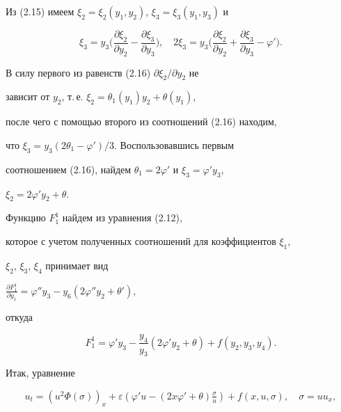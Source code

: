  


Из (2.15) имеем $\xi_2=\xi_2(y_1,y_2)$, $\xi_3=\xi_3(y_1,y_3)$ и 


\begin{equation} 


\xi_3=y_3\bigg( 


\frac{\partial\xi_2}{\partial y_2}- 


\frac{\partial\xi_3}{\partial y_3}\bigg),\quad 


2\xi_3=y_3\bigg( 


\frac{\partial\xi_2}{\partial y_2}+ 


\frac{\partial\xi_3}{\partial y_3}-\varphi'\bigg).\tag{2.16} 


\end{equation} 


В силу первого из равенств (2.16) $\partial\xi_2/\partial y_2$ не 


зависит от $y_2$, т.\,е. $\xi_2=\theta_1(y_1)y_2+\theta(y_1)$, 


после чего с помощью второго из соотношений (2.16) находим, 


что $\xi_3=y_3(2\theta_1-\varphi')/3$. Воспользовавшись первым 


соотношением (2.16), найдем $\theta_1=2\varphi'$ и $\xi_3=\varphi'y_3$, 


$\xi_2=2\varphi'y_2+\theta$. 


 


Функцию $F^1_1$ найдем из уравнения (2.12), 


которое с учетом полученных соотношений для коэффициентов $\xi_1$, 


$\xi_2$, $\xi_3$, $\xi_4$ принимает вид 


$\frac{\partial F^1_1}{\partial y_1}=\varphi''y_3-y_6 


(2\varphi''y_2+\theta')$, 


откуда 


$$ 


F^1_1=\varphi'y_3-\frac{y_4}{y_3}(2\varphi'y_2+\theta)+ 


f(y_2,y_3,y_4). 


$$ 


 


Итак, уравнение 


\begin{equation} 


u_t=(u^2\Phi(\sigma))_x+\varepsilon 


(\varphi'u-(2x\varphi'+\theta)\tfrac{\sigma}{u})+ 


f(x,u,\sigma),\quad \sigma=u u_x,\tag{2.17} 


\end{equation} 


